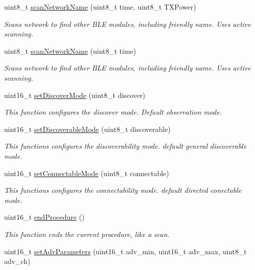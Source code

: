 \begin{DoxyCompactItemize}
uint8\+\_\+t \hyperlink{class_wasp_b_l_e_a2dce5f91acc42353a987fff5c8a1d302}{scan\+Network\+Name} (uint8\+\_\+t time, uint8\+\_\+t T\+X\+Power)
\begin{DoxyCompactList}\small\item\em Scans network to find other B\+LE modules, including friendly name. Uses active scanning. \end{DoxyCompactList}\item 
uint8\+\_\+t \hyperlink{class_wasp_b_l_e_af30e43863490e8f81ebb712002bacbe4}{scan\+Network\+Name} (uint8\+\_\+t time)
\begin{DoxyCompactList}\small\item\em Scans network to find other B\+LE modules, including friendly name. Uses active scanning. \end{DoxyCompactList}\item 
uint16\+\_\+t \hyperlink{class_wasp_b_l_e_a0e7e16ab51f5d1880e9a64f6a782786b}{set\+Discover\+Mode} (uint8\+\_\+t discover)
\begin{DoxyCompactList}\small\item\em This function configures the discover mode. Default observation mode. \end{DoxyCompactList}\item 
uint16\+\_\+t \hyperlink{class_wasp_b_l_e_a8631269b03ea48569bb135984a37e6e3}{set\+Discoverable\+Mode} (uint8\+\_\+t discoverable)
\begin{DoxyCompactList}\small\item\em This functions configures the discoverability mode. default general discoverable mode. \end{DoxyCompactList}\item 
uint16\+\_\+t \hyperlink{class_wasp_b_l_e_a1d550ec27250e37bc5fe05421be5f793}{set\+Connectable\+Mode} (uint8\+\_\+t connectable)
\begin{DoxyCompactList}\small\item\em This functions configures the connectability mode. default directed conectable mode. \end{DoxyCompactList}\item 
uint16\+\_\+t \hyperlink{class_wasp_b_l_e_aa223116c2df14c1a4fdf68c3e96fd7f3}{end\+Procedure} ()
\begin{DoxyCompactList}\small\item\em This function ends the current procedure, like a scan. \end{DoxyCompactList}\item 
uint16\+\_\+t \hyperlink{class_wasp_b_l_e_a56067c84584808bf2f237b6998df4d28}{set\+Adv\+Parameters} (uint16\+\_\+t adv\+\_\+min, uint16\+\_\+t adv\+\_\+max, uint8\+\_\+t adv\+\_\+ch)

\end{DoxyCompactItemize}
